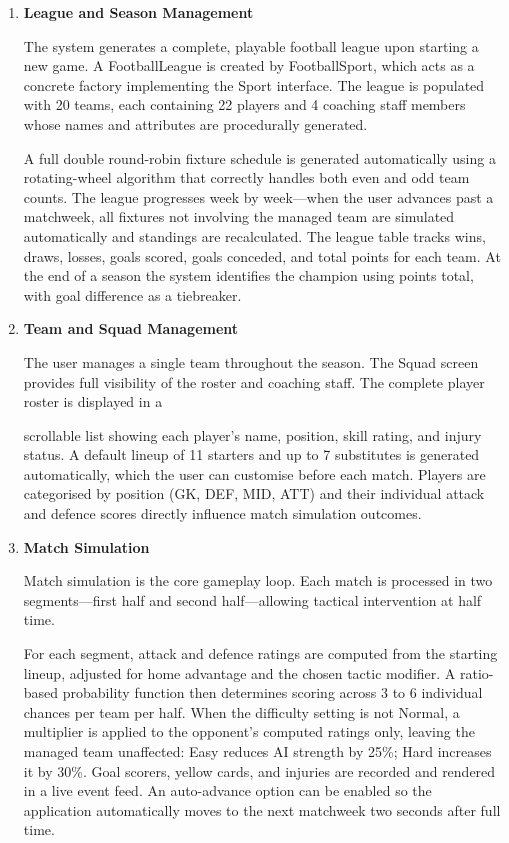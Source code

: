 \documentclass[11pt,a4paper]{article}
\begin{document}
\begin{enumerate}
\item \textbf{League and Season Management}

The system generates a complete, playable football league upon starting a new game. A FootballLeague is created by FootballSport, which acts as a concrete factory implementing the Sport interface. The league is populated with 20 teams, each containing 22 players and 4 coaching staff members whose names and attributes are procedurally generated.

A full double round-robin fixture schedule is generated automatically using a rotating-wheel algorithm that correctly handles both even and odd team counts. The league progresses week by week---when the user advances past a matchweek, all fixtures not involving the managed team are simulated automatically and standings are recalculated. The league table tracks wins, draws, losses, goals scored, goals conceded, and total points for each team. At the end of a season the system identifies the champion using points total, with goal difference as a tiebreaker.

\item \textbf{Team and Squad Management}

The user manages a single team throughout the season. The Squad screen provides full visibility of the roster and coaching staff. The complete player roster is displayed in a

scrollable list showing each player's name, position, skill rating, and injury status. A default lineup of 11 starters and up to 7 substitutes is generated automatically, which the user can customise before each match. Players are categorised by position (GK, DEF, MID, ATT) and their individual attack and defence scores directly influence match simulation outcomes.

\item \textbf{Match Simulation}

Match simulation is the core gameplay loop. Each match is processed in two segments---first half and second half---allowing tactical intervention at half time.

For each segment, attack and defence ratings are computed from the starting lineup, adjusted for home advantage and the chosen tactic modifier. A ratio-based probability function then determines scoring across 3 to 6 individual chances per team per half. When the difficulty setting is not Normal, a multiplier is applied to the opponent's computed ratings only, leaving the managed team unaffected: Easy reduces AI strength by 25\%; Hard increases it by 30\%. Goal scorers, yellow cards, and injuries are recorded and rendered in a live event feed. An auto-advance option can be enabled so the application automatically moves to the next matchweek two seconds after full time.


\end{enumerate}
\end{document}
